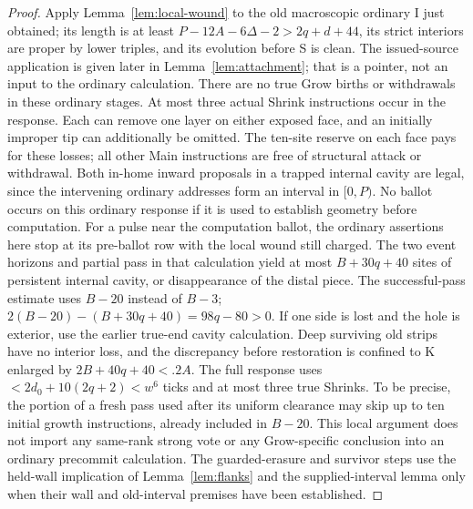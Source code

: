\begin{proof}
Apply Lemma~\ref{lem:local-wound} to the old macroscopic ordinary I just obtained; its length is at least \(P-12A-6\Delta-2>2q+d+44\), its strict interiors are proper by lower triples, and its evolution before S is clean. The issued-source application is given later in Lemma~\ref{lem:attachment}; that is a pointer, not an input to the ordinary calculation. There are no true Grow births or withdrawals in these ordinary stages. At most three actual Shrink instructions occur in the response. Each can remove one layer on either exposed face, and an initially improper tip can additionally be omitted. The ten-site reserve on each face pays for these losses; all other Main instructions are free of structural attack or withdrawal. Both in-home inward proposals in a trapped internal cavity are legal, since the intervening ordinary addresses form an interval in \([0,P)\). No ballot occurs on this ordinary response if it is used to establish geometry before computation. For a pulse near the computation ballot, the ordinary assertions here stop at its pre-ballot row with the local wound still charged. The two event horizons and partial pass in that calculation yield at most \(B+30q+40\) sites of persistent internal cavity, or disappearance of the distal piece. The successful-pass estimate uses \(B- 20\) instead of \(B- 3\); \(2(B-20)-(B+30q+40)=98q-80>0\). If one side is lost and the hole is exterior, use the earlier true-end cavity calculation. Deep surviving old strips have no interior loss, and the discrepancy before restoration is confined to K enlarged by \(2B+40q+40<.2A\). The full response uses \(<2d_0+10(2q+2)<w^6\) ticks and at most three true Shrinks. To be precise, the portion of a fresh pass used after its uniform clearance may skip up to ten initial growth instructions, already included in \(B- 20\). This local argument does not import any same-rank strong vote or any Grow-specific conclusion into an ordinary precommit calculation. The guarded-erasure and survivor steps use the held-wall implication of Lemma~\ref{lem:flanks} and the supplied-interval lemma only when their wall and old-interval premises have been established.


\end{proof}
